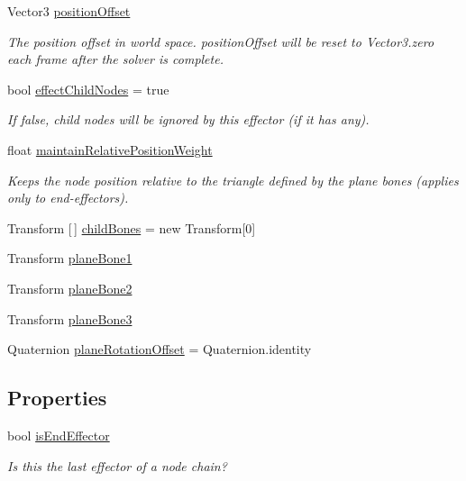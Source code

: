 \begin{DoxyCompactItemize}
Vector3 \mbox{\hyperlink{class_root_motion_1_1_final_i_k_1_1_i_k_effector_a52f2871aaf5b38273bde9e1910b6626b}{position\+Offset}}
\begin{DoxyCompactList}\small\item\em The position offset in world space. position\+Offset will be reset to Vector3.\+zero each frame after the solver is complete. \end{DoxyCompactList}\item 
bool \mbox{\hyperlink{class_root_motion_1_1_final_i_k_1_1_i_k_effector_a39c074d94dc7f56e8937c9fe8ace7b98}{effect\+Child\+Nodes}} = true
\begin{DoxyCompactList}\small\item\em If false, child nodes will be ignored by this effector (if it has any). \end{DoxyCompactList}\item 
float \mbox{\hyperlink{class_root_motion_1_1_final_i_k_1_1_i_k_effector_af4de90c9a0646ec31ca83c4a00e9a160}{maintain\+Relative\+Position\+Weight}}
\begin{DoxyCompactList}\small\item\em Keeps the node position relative to the triangle defined by the plane bones (applies only to end-\/effectors). \end{DoxyCompactList}\item 
Transform \mbox{[}$\,$\mbox{]} \mbox{\hyperlink{class_root_motion_1_1_final_i_k_1_1_i_k_effector_aa309536ed05fe57423325c4623f305b2}{child\+Bones}} = new Transform\mbox{[}0\mbox{]}
\item 
Transform \mbox{\hyperlink{class_root_motion_1_1_final_i_k_1_1_i_k_effector_a5b53ab6d498f54959468909b5865db7c}{plane\+Bone1}}
\item 
Transform \mbox{\hyperlink{class_root_motion_1_1_final_i_k_1_1_i_k_effector_a487ba446fe0c71de704c5c798058ecf0}{plane\+Bone2}}
\item 
Transform \mbox{\hyperlink{class_root_motion_1_1_final_i_k_1_1_i_k_effector_a6690da56f9c18074ac0797b2ec30de3f}{plane\+Bone3}}
\item 
Quaternion \mbox{\hyperlink{class_root_motion_1_1_final_i_k_1_1_i_k_effector_a30e320b68032a01d039bf52c71f1bfbe}{plane\+Rotation\+Offset}} = Quaternion.\+identity
\end{DoxyCompactItemize}
\subsection*{Properties}
\begin{DoxyCompactItemize}
\item 
bool \mbox{\hyperlink{class_root_motion_1_1_final_i_k_1_1_i_k_effector_ac6504b5ec6271aacdc2a7d8cbd2adcb6}{is\+End\+Effector}}
\begin{DoxyCompactList}\small\item\em Is this the last effector of a node chain? \end{DoxyCompactList}\end{DoxyCompactItemize}


